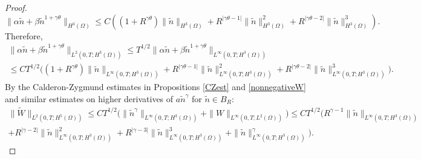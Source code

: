 \documentclass[12pt]{article}
\theoremstyle{plain}
\begin{document}
\begin{proof}
\begin{equation*}
\|\alpha \tilde{n} + \beta \tilde{n}^{1 + \gamma \theta}\|_{H^{3}(\Omega)} \le C\left((1 + R^{\gamma \theta} )\|\tilde{n}\|_{H^{3}(\Omega)} + R^{|\gamma \theta - 1|}\|\tilde{n}\|^{2}_{H^{3}(\Omega)} + R^{|\gamma \theta - 2|} \|\tilde{n}\|^{3}_{H^{3}(\Omega)}\right).
\end{equation*}
Therefore,
\begin{multline*}
\|\alpha \tilde{n} + \beta \tilde{n}^{1 + \gamma \theta}\|_{L^{2}(0, T; H^{3}(\Omega))} \le T^{1/2} \|\alpha \tilde{n} + \beta \tilde{n}^{1 + \gamma \theta}\|_{L^{\infty}(0, T; H^{3}(\Omega))} \\
\le CT^{1/2}\Big((1 + R^{\gamma \theta}) \|\tilde{n}\|_{L^{\infty}(0, T; H^{3}(\Omega))} + R^{|\gamma \theta - 1|} \|\tilde{n}\|^{2}_{L^{\infty}(0, T; H^{3}(\Omega))} + R^{|\gamma \theta - 2|} \|\tilde{n}\|_{L^{\infty}(0, T; H^{3}(\Omega))}^{3}\Big).
\end{multline*}
By the Calderon-Zygmund estimates in Propositions \ref{CZest} and \ref{nonnegativeW} and similar estimates on higher derivatives of $a\tilde{n}^{\gamma}$ for $\tilde{n} \in B_{R}$:
\begin{multline*}
\|\tilde{W}\|_{L^{2}(0, T; H^{5}(\Omega))} \le CT^{1/2} \Big(\|\tilde{n}^{\gamma}\|_{L^{\infty}(0, T; H^{3}(\Omega))} + \|W\|_{L^{\infty}(0, T; L^{2}(\Omega))}\Big) \le CT^{1/2}\Big(R^{\gamma - 1}\|\tilde{n}\|_{L^{\infty}(0, T; H^{3}(\Omega))} \\
+ R^{|\gamma - 2|}\|\tilde{n}\|_{L^{\infty}(0, T; H^{3}(\Omega))}^{2} + R^{|\gamma - 3|}\|\tilde{n}\|_{L^{\infty}(0, T; H^{3}(\Omega))}^{3} + \|\tilde{n}\|_{L^{\infty}(0, T; H^{3}(\Omega))}^{\gamma}\Big).
\end{multline*}


\end{proof}
\end{document}
